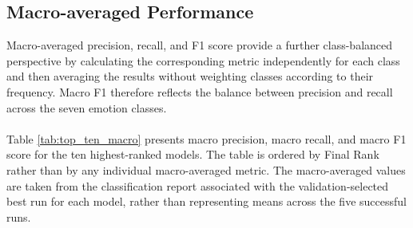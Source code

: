 \documentclass[12pt, a4paper]{report}
\let\oldsubsection\subsection
\renewcommand{\subsection}{%
    \Needspace{6\baselineskip}%
    \oldsubsection
}
\begin{document}
			\subsection{Macro-averaged Performance}
				
				Macro-averaged precision, recall, and F1 score provide a further class-balanced perspective by calculating the corresponding metric independently for each class and then averaging the results without weighting classes according to their frequency. Macro F1 therefore reflects the balance between precision and recall across the seven emotion classes.\\\\
				Table \ref{tab:top_ten_macro} presents macro precision, macro recall, and macro F1 score for the ten highest-ranked models. The table is ordered by Final Rank rather than by any individual macro-averaged metric. The macro-averaged values are taken from the classification report associated with the validation-selected best run for each model, rather than representing means across the five successful runs.\\
				\setlength{\tabcolsep}{3pt}
				\begin{table}[h!]
					\centering
					\caption{Macro-averaged Precision, Recall and F1 Scores for the Ten Highest-ranked Models}
					\label{tab:top_ten_macro}
				\end{table}\\
\end{document}
